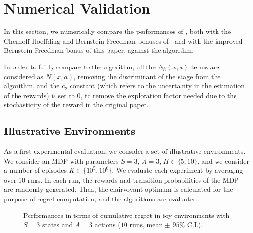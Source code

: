 \section{Numerical Validation}
\label{sec:experiments}

In this section, we numerically compare the performances of \ucbvi, both with the Chernoff-Hoeffding and Bernstein-Freedman bonuses of~\citep{azar2017minimax} and with the improved Bernstein-Freedman bonus of this paper, against the \mvp algorithm.

In order to fairly compare to the \mvp algorithm, all the $N_h(x,a)$ terms are considered as $N(x,a)$, removing the discriminant of the stage from the algorithm, and the $c_2$ constant (which refers to the uncertainty in the estimation of the rewards) is set to $0$, to remove the exploration factor needed due to the stochasticity of the reward in the original paper.

\subsection{Illustrative Environments}

As a first experimental evaluation, we consider a set of illustrative environments. We consider an MDP with parameters $S=3$, $A=3$, $H \in \{5, 10\}$, and we consider a number of episodes $K \in \{10^5, 10^6\}$. We evaluate each experiment by averaging over 10 runs. In each run, the rewards and transition probabilities of the MDP are randomly generated. Then, the clairvoyant optimum is calculated for the purpose of regret computation, and the algorithms are evaluated.

\begin{figure*}[t!]
    \centering

    \hspace{0.8cm}
    \hfill
    \hspace{1cm}

    \vspace{0.3cm}

    \hspace{0.8cm}
    \hfill
    \hspace{1cm}
    
    \caption{Performances in terms of cumulative regret in toy environments with $S=3$ states and $A=3$ actions ($10$ runs, mean $\pm$ $95\%$ C.I.).}
    \label{fig:TODO2}
\end{figure*}



